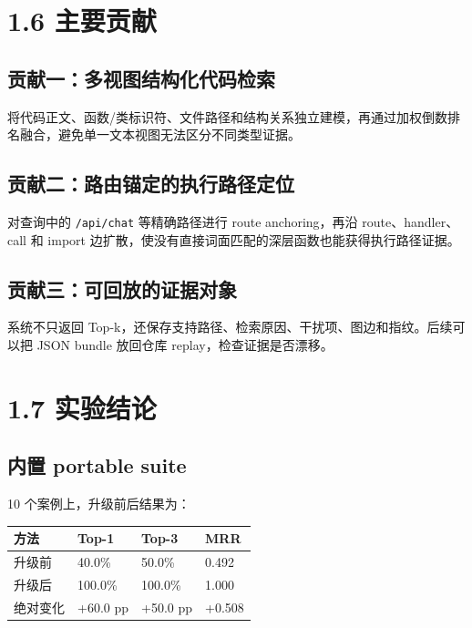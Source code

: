 \documentclass[UTF8,12pt,openany]{ctexbook}
\begin{document}
\section{1.6 主要贡献}

\subsection{贡献一：多视图结构化代码检索}

将代码正文、函数/类标识符、文件路径和结构关系独立建模，再通过加权倒数排名融合，避免单一文本视图无法区分不同类型证据。\par

\subsection{贡献二：路由锚定的执行路径定位}

对查询中的 \texttt{/api/chat} 等精确路径进行 route anchoring，再沿 route、handler、call 和 import 边扩散，使没有直接词面匹配的深层函数也能获得执行路径证据。\par

\subsection{贡献三：可回放的证据对象}

系统不只返回 Top-k，还保存支持路径、检索原因、干扰项、图边和指纹。后续可以把 JSON bundle 放回仓库 replay，检查证据是否漂移。\par

\section{1.7 实验结论}

\subsection{内置 portable suite}

10 个案例上，升级前后结果为：\par

\begin{center}
\small
\begin{longtable}{|p{}|p{}|p{}|p{}|}
\toprule
方法 & Top-1 & Top-3 & MRR \\
\midrule
升级前 & 40.0\% & 50.0\% & 0.492 \\
升级后 & 100.0\% & 100.0\% & 1.000 \\
绝对变化 & +60.0 pp & +50.0 pp & +0.508 \\
\bottomrule
\end{longtable}
\end{center}
\end{document}

